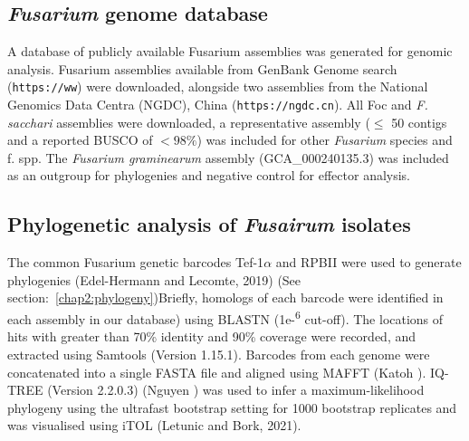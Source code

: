 \subsection{\textit{Fusarium} genome database}\label{chap3:fusariumdb}
A database of publicly available Fusarium assemblies was generated for genomic analysis. Fusarium assemblies available from GenBank Genome search (\texttt{https://ww}) were downloaded, alongside two \Foc assemblies from the National Genomics Data Centra (NGDC), China (\texttt{https://ngdc.cn}). All Foc and \textit{F. sacchari }assemblies were downloaded, a representative assembly (\( \leq \) 50 contigs and a reported BUSCO of \(<98\% \)) was included for other \textit{Fusarium} species and f. spp. The \textit{Fusarium graminearum} assembly (GCA\_000240135.3) was included as an outgroup for phylogenies and negative control for effector analysis.

\subsection{Phylogenetic analysis of \textit{Fusairum} isolates}
The common Fusarium genetic barcodes Tef-1\(\alpha\) and RPBII  were used to generate phylogenies (Edel-Hermann and Lecomte, 2019) (See section:~\ref{chap2:phylogeny})Briefly, homologs of each barcode were identified in each assembly in our database) using BLASTN (1e-\textsuperscript{6} cut-off). The locations of hits with greater than 70\% identity and 90\% coverage were recorded, and extracted using Samtools (Version 1.15.1). Barcodes from each genome were concatenated into a single FASTA file and aligned using MAFFT (Katoh ). IQ-TREE (Version 2.2.0.3) (Nguyen ) was used to infer a maximum-likelihood phylogeny using the ultrafast bootstrap setting for 1000 bootstrap replicates and was visualised using iTOL (Letunic and Bork, 2021). 

